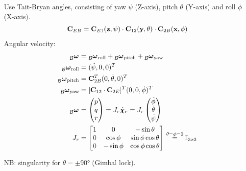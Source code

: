 \documentclass[a4paper, 8pt]{extarticle}
\newcommand{\mvec}[3]{  \prescript{}{\mathcal{#1}}{\bm{#2}}  _{#3} }
\begin{document}
\begin{multicols*}{3}
Use Tait-Bryan angles, consisting of yaw $\psi$ (Z-axis), pitch $\theta$ (Y-axis) and roll $\phi$ (X-axis). 
$${\bf C}_{EB} = {\bf C}_{E1}({\bf z}, \psi) \cdot {\bf C}_{12}({\bf y}, \theta) \cdot {\bf C}_{2B}({\bf x}, \phi)$$
Angular velocity:
\begin{align*}
\mvec{B}{\omega}{} &= \mvec{B}{\omega}{\text{roll}} + \mvec{B}{\omega}{\text{pitch}} + \mvec{B}{\omega}{\text{yaw}}\\
\mvec{B}{\omega}{\text{roll}} &= (\dot\psi, 0, 0)^T\\
\mvec{B}{\omega}{\text{pitch}} &= {\bf C}_{2B}^T(0,\dot\theta, 0)^T\\
\mvec{B}{\omega}{\text{yaw}} &= [{\bf C}_{12}\cdot {\bf C}_{2E}]^T (0, 0, \dot\phi)^T \\
\mvec{B}{\omega}{} &= \begin{pmatrix}
p \\ q \\ r
\end{pmatrix} = J_r\dot{\bm \chi}_r = J_r \begin{pmatrix}
\dot\phi\\
\dot\theta\\
\dot\psi
\end{pmatrix} \\
J_r &= \begin{bmatrix}
1 & 0 & -\sin\theta \\
0 & \cos\phi  &  \sin\phi\cos\theta \\
0 & -\sin\phi  &  \cos\phi\cos\theta
\end{bmatrix}\overset{\theta=\phi=0}{=}\mathbb{I}_{3x3}
\end{align*} \newline

NB: singularity for $\theta = \pm \ang{90}$ (Gimbal lock).



\end{multicols*}
\end{document}
